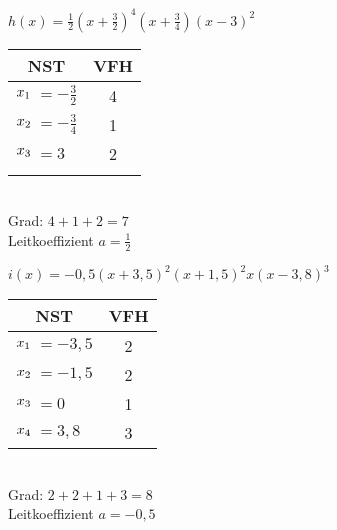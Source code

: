 \begin{minipage}{0.47\textwidth}\raggedright
	\(h(x)=\frac{1}{2}\left(x+\frac{3}{2}\right)^4\left(x+\frac{3}{4}\right)\left(x-3\right)^2\)\\ \vspace{0.3cm}
	{\color{loes}\begin{minipage}{0.8\linewidth}
			\begin{tabular}{rlc}
				\multicolumn{2}{c}{NST}&VFH\\
				\midrule
				\(x_1\hspace{-0.3cm}\)&\(=-\frac{3}{2}\)&4\\
				\(x_2\hspace{-0.3cm}\)&\(=-\frac{3}{4}\)&1\\
				\(x_3\hspace{-0.3cm}\)&\(=3\)&2\\
				\phantom{\(x_3\)}&\phantom{\(=2\)}&\phantom{1}
			\end{tabular}
		\end{minipage}\\
		Grad: \(4+1+2=7\)\\
		Leitkoeffizient \(a=\frac{1}{2}\)\\}
\end{minipage}
\begin{minipage}{0.47\textwidth}\raggedright
	\(i(x)=-0,5\left(x+3,5\right)^2\left(x+1,5\right)^2x\left(x-3,8\right)^3\)\\ \vspace{0.3cm}
	{\color{loes}\begin{minipage}{0.8\linewidth}
			\begin{tabular}{rlc}
				\multicolumn{2}{c}{NST}&VFH\\
				\midrule
				\(x_1\hspace{-0.3cm}\)&\(=-3,5\)&2\\
				\(x_2\hspace{-0.3cm}\)&\(=-1,5\)&2\\
				\(x_3\hspace{-0.3cm}\)&\(=0\)&1\\
				\(x_4\hspace{-0.3cm}\)&\(=3,8\)&3
			\end{tabular}
		\end{minipage}\\
		Grad: \(2+2+1+3=8\)\\
		Leitkoeffizient \(a=-0,5\)\\}
\end{minipage}\\
